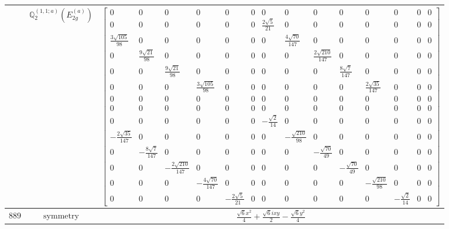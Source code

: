 \documentclass[fleqn,8pt,landscape]{jsarticle}
\begin{document}
\begin{longtable}{ccc}
$  $ & $ \mathbb{Q}_{2}^{(1,1;a)}(E_{2g}^{(a)}) $ & $ \begin{bmatrix} 0 & 0 & 0 & 0 & 0 & 0 & 0 & 0 & 0 & 0 & 0 & 0 & 0 & 0 \\ 0 & 0 & 0 & 0 & 0 & 0 & \frac{2 \sqrt{5}}{21} & 0 & 0 & 0 & 0 & 0 & 0 & 0 \\ \frac{3 \sqrt{105}}{98} & 0 & 0 & 0 & 0 & 0 & 0 & \frac{4 \sqrt{70}}{147} & 0 & 0 & 0 & 0 & 0 & 0 \\ 0 & \frac{9 \sqrt{21}}{98} & 0 & 0 & 0 & 0 & 0 & 0 & \frac{2 \sqrt{210}}{147} & 0 & 0 & 0 & 0 & 0 \\ 0 & 0 & \frac{9 \sqrt{21}}{98} & 0 & 0 & 0 & 0 & 0 & 0 & \frac{8 \sqrt{7}}{147} & 0 & 0 & 0 & 0 \\ 0 & 0 & 0 & \frac{3 \sqrt{105}}{98} & 0 & 0 & 0 & 0 & 0 & 0 & \frac{2 \sqrt{35}}{147} & 0 & 0 & 0 \\ 0 & 0 & 0 & 0 & 0 & 0 & 0 & 0 & 0 & 0 & 0 & 0 & 0 & 0 \\ 0 & 0 & 0 & 0 & 0 & 0 & 0 & 0 & 0 & 0 & 0 & 0 & 0 & 0 \\ 0 & 0 & 0 & 0 & 0 & 0 & - \frac{\sqrt{2}}{14} & 0 & 0 & 0 & 0 & 0 & 0 & 0 \\ - \frac{2 \sqrt{35}}{147} & 0 & 0 & 0 & 0 & 0 & 0 & - \frac{\sqrt{210}}{98} & 0 & 0 & 0 & 0 & 0 & 0 \\ 0 & - \frac{8 \sqrt{7}}{147} & 0 & 0 & 0 & 0 & 0 & 0 & - \frac{\sqrt{70}}{49} & 0 & 0 & 0 & 0 & 0 \\ 0 & 0 & - \frac{2 \sqrt{210}}{147} & 0 & 0 & 0 & 0 & 0 & 0 & - \frac{\sqrt{70}}{49} & 0 & 0 & 0 & 0 \\ 0 & 0 & 0 & - \frac{4 \sqrt{70}}{147} & 0 & 0 & 0 & 0 & 0 & 0 & - \frac{\sqrt{210}}{98} & 0 & 0 & 0 \\ 0 & 0 & 0 & 0 & - \frac{2 \sqrt{5}}{21} & 0 & 0 & 0 & 0 & 0 & 0 & - \frac{\sqrt{2}}{14} & 0 & 0 \end{bmatrix} $ \\ \hline
$ 889 $ & $ \text{symmetry} $ & $ \frac{\sqrt{6} x^{2}}{4} + \frac{\sqrt{6} i x y}{2} - \frac{\sqrt{6} y^{2}}{4} $ \\

\end{longtable}
\end{document}
